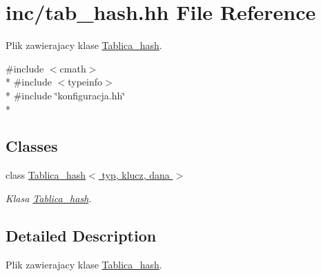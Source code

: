 \hypertarget{tab__hash_8hh}{\section{inc/tab\-\_\-hash.hh File Reference}
\label{tab__hash_8hh}
}


Plik zawierajacy klase \hyperlink{class_tablica__hash}{Tablica\-\_\-hash}.  


{\ttfamily \#include $<$cmath$>$}\\*
{\ttfamily \#include $<$typeinfo$>$}\\*
{\ttfamily \#include \char`\"{}konfiguracja.\-hh\char`\"{}}\\*
\subsection*{Classes}
\begin{DoxyCompactItemize}
\item 
class \hyperlink{class_tablica__hash}{Tablica\-\_\-hash$<$ typ, klucz, dana $>$}
\begin{DoxyCompactList}\small\item\em Klasa \hyperlink{class_tablica__hash}{Tablica\-\_\-hash}. \end{DoxyCompactList}\end{DoxyCompactItemize}


\subsection{Detailed Description}
Plik zawierajacy klase \hyperlink{class_tablica__hash}{Tablica\-\_\-hash}. 